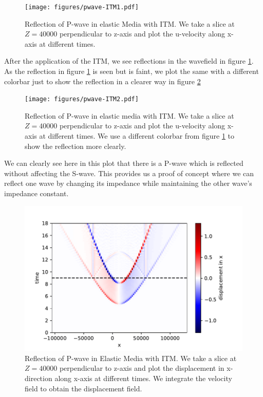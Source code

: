 \begin{figure}
    \centering
    \texttt{[image: figures/pwave-ITM1.pdf]}
    \caption{Reflection of P-wave in elastic Media with \ac{ITM}. We take a slice at $Z=40000$ perpendicular to z-axis
    and plot the u-velocity along x-axis at different times.}
    \label{fig:space-timeplot-pwave}
\end{figure}

After the application of the \ac{ITM}, we see reflections in the wavefield in figure \ref{fig:space-timeplot-pwave}.
As the reflection in figure \ref{fig:space-timeplot-pwave} is seen but is faint, we plot the same with a different colorbar just to show the reflection in a clearer
way in figure \ref{fig:space-timeplot-pwave2}

\begin{figure} %
    \centering
    \texttt{[image: figures/pwave-ITM2.pdf]}
    \caption{Reflection of P-wave in elastic media with \ac{ITM}. We take a slice at $Z=40000$ perpendicular to z-axis
    and plot the u-velocity along x-axis at different times. We use a different colorbar from figure \ref{fig:space-timeplot-pwave} to show the reflection more clearly.}
    \label{fig:space-timeplot-pwave2}
\end{figure}

We can clearly see here in this plot that there is a P-wave which is reflected without affecting the S-wave. This provides us a proof of concept where we 
can reflect one wave by changing its impedance while maintaining the other wave's impedance constant.

\begin{figure} %
    \centering
    \includegraphics[width=0.75\linewidth]{figures/pwave-ITMdisplacement.pdf}
    \caption{Reflection of P-wave in Elastic Media with \ac{ITM}. We take a slice at $Z=40000$ perpendicular to z-axis
    and plot the displacement in x-direction along x-axis at different times. We integrate the velocity field to obtain the displacement field.}
    \label{fig:space-timeplot-pwavedisplacement}
\end{figure}


